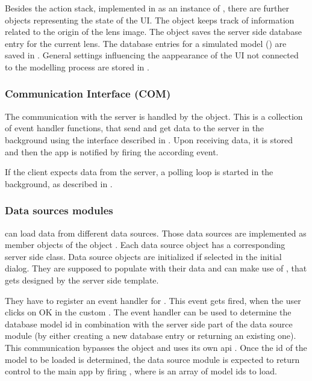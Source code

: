 

Besides the action stack, implemented in  as an instance of , there are further objects representing the state of the UI.
The object  keeps track of information related to the origin of the lens image.
The object  saves the server side database entry for the current lens.
The database entries for a simulated model () are saved in .
General settings influencing the aappearance of the UI not connected to the modelling process are stored in .




\subsubsection{Communication Interface (COM)}
The communication with the server is handled by the  object.
This is a collection of event handler functions, that send and get data to the server in the background using the interface described in .
Upon receiving data, it is stored and then the app is notified by firing the according event.

If the client expects data from the server, a polling loop is started in the background, as described in .


\subsubsection{Data sources modules}

\spl can load data from different data sources.
Those data sources are implemented as member objects of the object .
Each data source object has a corresponding server side class.
Data source objects are initialized if selected in the initial dialog.
They are supposed to populate  with their data and can make use of , that gets designed by the server side template.

They have to register an event handler for .
This event gets fired, when the user clicks on OK in the custom .
The event handler can be used to determine the database model id in combination with the server side part of the data source module (by either creating a new database entry or returning an existing one). This communication bypasses the  object and uses its own api .
Once the id of the model to be loaded is determined, the data source module is expected to return control to the main app by firing , where  is an array of model ids to load.

